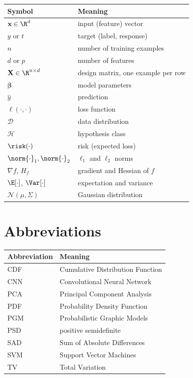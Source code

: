 \documentclass[a4paper, 12pt]{book}
\begin{document}
\begin{center}
\renewcommand{\arraystretch}{1.25}
\begin{tabular}{ll}
\toprule
Symbol & Meaning \\
\midrule
$\mathbf{x} \in \R^d$ & input (feature) vector \\
$y$ or $t$ & target (label, response) \\
$n$ & number of training examples \\
$d$ or $p$ & number of features \\
$\mathbf{X} \in \R^{n \times d}$ & design matrix, one example per row \\
$\boldsymbol{\beta}$ & model parameters \\
$\hat{y}$ & prediction \\
$\ell(\cdot,\cdot)$ & loss function \\
$\mathscr{D}$ & data distribution \\
$\mathcal{H}$ & hypothesis class \\
$\risk(\cdot)$ & risk (expected loss) \\
$\norm{\cdot}_1, \norm{\cdot}_2$ & $\ell_1$ and $\ell_2$ norms \\
$\nabla f$, $H_f$ & gradient and Hessian of $f$ \\
$\E[\cdot]$, $\Var[\cdot]$ & expectation and variance \\
$\mathscr{N}(\mu,\Sigma)$ & Gaussian distribution \\
\bottomrule
\end{tabular}
\end{center}

\newpage
\section*{Abbreviations}

\begin{center}
\renewcommand{\arraystretch}{1.25}
\begin{tabular}{ll}
\toprule
Abbreviation & Meaning \\
\midrule
CDF & Cumulative Distribution Function \\
CNN & Convolutional Neural Network \\
PCA & Principal Component Analysis \\
PDF & Probability Density Function \\
PGM & Probabilistic Graphic Models \\  
PSD & positive semidefinite \\
SAD & Sum of Absolute Differences \\
SVM & Support Vector Machines \\
TV & Total Variation \\
\bottomrule
\end{tabular}
\end{center}
\end{document}

